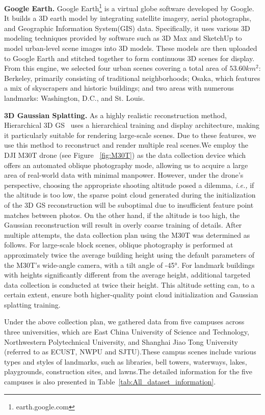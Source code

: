 \textbf{Google Earth.} 
Google Earth\footnote{earth.google.com} is a virtual globe software developed by Google. It builds a 3D earth model by integrating satellite imagery, aerial photographs, and Geographic Information System(GIS) data. Specifically, it uses various 3D modeling techniques provided by software such as 3D Max and SketchUp to model urban-level scene images into 3D models. These models are then uploaded to Google Earth and stitched together to form continuous 3D scenes for display.
From this engine, we selected four urban scenes covering a total area of $53.60 km^2 $: Berkeley, primarily consisting of traditional neighborhoods; Osaka, which features a mix of skyscrapers and historic buildings; and two areas with numerous landmarks: Washington, D.C., and St. Louis.


\textbf{3D Gaussian Splatting.} As a highly realistic reconstruction method, Hierarchical 3D GS~\cite{kerbl2024hierarchical} uses a hierarchical training and display architecture, making it particularly suitable for rendering large-scale scenes. Due to these features, we use this method to reconstruct and render multiple real scenes.We employ the DJI M30T drone (see Figure ~\ref{fig:M30T}) as the data collection device which offers an automated oblique photography mode, allowing us to acquire a large area of real-world data with minimal manpower. However, under the drone's perspective, choosing the appropriate shooting altitude posed a dilemma, \emph{i.e.,} if the altitude is too low, the sparse point cloud generated during the initialization of the 3D GS reconstruction will be suboptimal due to insufficient feature point matches between photos. On the other hand, if the altitude is too high, the Gaussian reconstruction will result in overly coarse training of details. After multiple attempts, the data collection plan using the M30T was determined as follows. For large-scale block scenes, oblique photography is performed at approximately twice the average building height using the default parameters of the M30T’s wide-angle camera, with a tilt angle of -45°. For landmark buildings with heights significantly different from the average height, additional targeted data collection is conducted at twice their height. This altitude setting can, to a certain extent, ensure both higher-quality point cloud initialization and Gaussian splatting training.

Under the above collection plan, we gathered data from five campuses across three universities, which are East China University of Science and Technology, Northwestern Polytechnical University, and Shanghai Jiao Tong University (referred to as ECUST, NWPU and SJTU).These campus scenes include various types and styles of landmarks, such as libraries, bell towers, waterways, lakes, playgrounds, construction sites, and lawns.The detailed information for the five campuses is also presented in Table~\ref{tab:All_dataset_information}.

